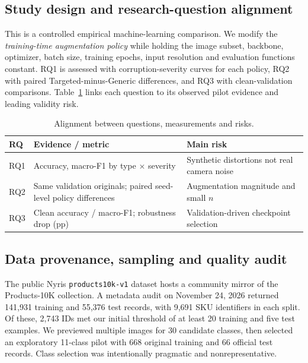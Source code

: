 \documentclass[sigconf,nonacm]{acmart}
\begin{document}
\subsection{Study design and research-question alignment}
This is a controlled empirical machine-learning comparison. We modify the \emph{training-time augmentation policy} while holding the image subset, backbone, optimizer, batch size, training epochs, input resolution and evaluation functions constant. RQ1 is assessed with corruption-severity curves for each policy, RQ2 with paired Targeted-minus-Generic differences, and RQ3 with clean-validation comparisons. Table~\ref{tab:alignment} links each question to its observed pilot evidence and leading validity risk.

\begin{table}[t]
\caption{Alignment between questions, measurements and risks.}
\label{tab:alignment}
\small
\begin{tabular}{p{}p{}p{}}
\toprule
RQ & Evidence / metric & Main risk\\
\midrule
RQ1 & Accuracy, macro-F1 by type $\times$ severity & Synthetic distortions not real camera noise\\
RQ2 & Same validation originals; paired seed-level policy differences & Augmentation magnitude and small $n$\\
RQ3 & Clean accuracy / macro-F1; robustness drop (pp) & Validation-driven checkpoint selection\\
\bottomrule
\end{tabular}
\end{table}

\subsection{Data provenance, sampling and quality audit}
The public Nyris \texttt{products10k-v1} dataset hosts a community mirror of the Products-10K collection. A metadata audit on November 24, 2026 returned 141,931 training and 55,376 test records, with 9,691 SKU identifiers in each split. Of these, 2,743 IDs met our initial threshold of at least 20 training and five test examples. We previewed multiple images for 30 candidate classes, then selected an exploratory 11-class pilot with 668 original training and 66 official test records. Class selection was intentionally pragmatic and nonrepresentative.
\end{document}
